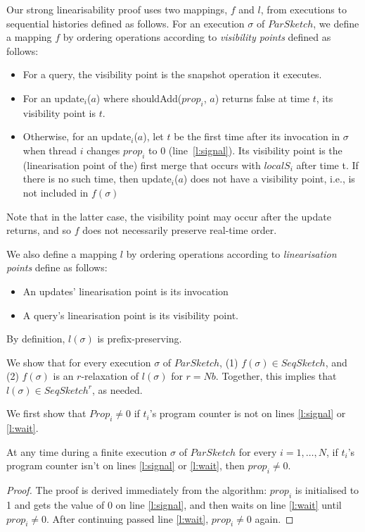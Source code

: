 Our strong linearisability proof uses two mappings, $f$ and $l$, from 
executions to sequential histories defined as follows.
For an execution $\sigma$ of $ParSketch$, we define a mapping $f$ 
by ordering operations according to \emph{visibility points} defined as follows: 
\begin{itemize}
\item
For a query, the visibility point is the snapshot operation it executes.
\item 
For an update$_i$($a$) where shouldAdd($prop_i$, $a$) returns false at time $t$, its visibility point is $t$.
\item
Otherwise, for an update$_i$($a$), let $t$ be the first time after its invocation in $\sigma$
when thread $i$ changes $prop_i$ to 0 (line~\ref{l:signal}).
Its visibility point is the (linearisation point of the) first merge that occurs with $localS_i$ after time t.
If there is no such time, then update$_i$($a$) does not have a visibility point, i.e., is not included in $f(\sigma)$
\end{itemize}
Note that in the latter case,
the visibility point may occur after the update returns, and so $f$ does not 
necessarily preserve real-time order. 
 
We also define a mapping $l$ by ordering operations according to
\emph{linearisation points} define as follows:
\begin{itemize}
    \item
    An updates' linearisation point is its invocation
    \item
    A query's linearisation point is its visibility point.
\end{itemize}
By definition, $l(\sigma)$ is prefix-preserving.

We show that for every execution $\sigma$ of $ParSketch$,
(1) $f(\sigma) \in SeqSketch$, and 
(2) $f(\sigma)$ is an $r$-relaxation of $l(\sigma)$ for $r=N b$.  
Together, this implies that $l(\sigma) \in SeqSketch^r$, as needed.

We first show that $Prop_i \neq 0$ if $t_i$'s program counter is not on lines \ref{l:signal} or \ref{l:wait}.
\begin{invariant}
    At any time during a finite execution $\sigma$ of $ParSketch$ for every $i=1,\dots,N$, if $t_i$'s program
    counter isn't on lines \ref{l:signal} or \ref{l:wait}, then $prop_i \neq 0$.
    \label{inv:prop-neq-0}
\end{invariant}
\begin{proof}
    The proof is derived immediately from the algorithm: $prop_i$ is initialised to 1 and gets
    the value of 0 on line \ref{l:signal}, and then waits on line \ref{l:wait} until $prop_i \neq 0$.
    After continuing passed line \ref{l:wait}, $prop_i \neq 0$ again.
\end{proof}

